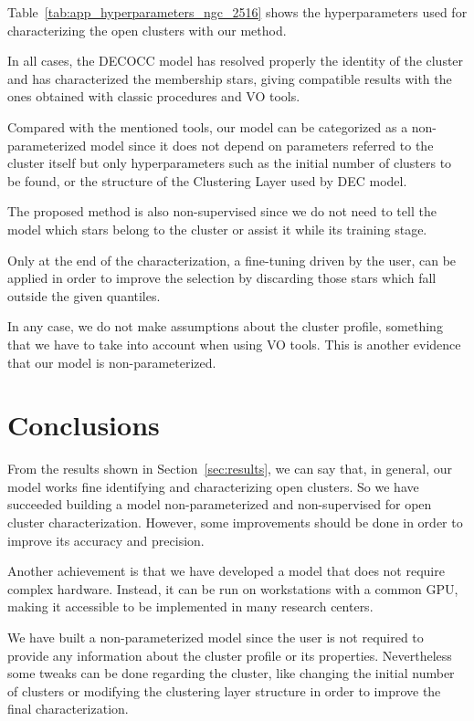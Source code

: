 \documentclass[11pt,a4paper,english,twocolumn]{article}
\begin{document}
Table~\ref{tab:app_hyperparameters_ngc_2516} shows the hyperparameters used for characterizing the
open clusters with our method.

In all cases, the DECOCC model has resolved properly the identity of the cluster and has characterized
the membership stars, giving compatible results with the ones obtained with classic procedures and VO
tools.

Compared with the mentioned tools, our model can be categorized as a non-parameterized model since it
does not depend on parameters referred to the cluster itself but only hyperparameters such as the
initial number of clusters to be found, or the structure of the Clustering Layer used by DEC model.

The proposed method is also non-supervised since we do not need to tell the model which stars belong
to the cluster or assist it while its training stage.

Only at the end of the characterization, a fine-tuning driven by the user, can be applied in order to
improve the selection by discarding those stars which fall outside the given quantiles.

In any case, we do not make assumptions about the cluster profile, something that we have to take into
account when using VO tools. This is another evidence that our model is non-parameterized.

\section{Conclusions}

From the results shown in Section~\ref{sec:results}, we can say that, in general,
our model works fine identifying and characterizing open clusters.
So we have succeeded building a model non-parameterized and non-supervised
for open cluster characterization. However, some improvements should be done
in order to improve its accuracy and precision.

Another achievement is that we have developed a model that does not require
complex hardware. Instead, it can be run on workstations with a common GPU,
making it accessible to be implemented in many research centers.

We have built a non-parameterized model since the user is not required to provide
any information about the cluster profile or its properties.
Nevertheless some tweaks can be done regarding the cluster, like changing the initial
number of clusters or modifying the clustering layer structure in order to improve
the final characterization.
\end{document}
